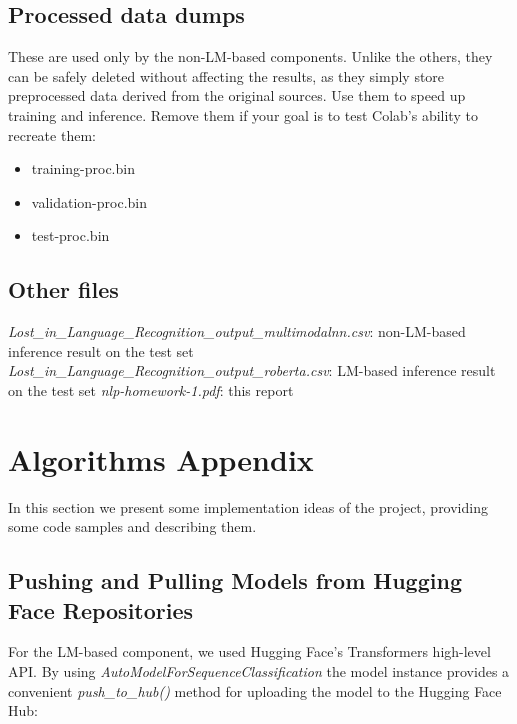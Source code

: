 \documentclass[11pt]{article}
\begin{document}
	 \subsection{Processed data dumps}
	 
	 These are used only by the non-LM-based components. Unlike the others, 
	 they can be safely deleted without affecting the results, 
	 as they simply store preprocessed data derived from the original sources. 
	 Use them to speed up training and inference. 
	 Remove them if your goal is to test Colab’s ability to recreate them:
	 
	 \begin{itemize}
	 	\item training-proc.bin
	 	\item validation-proc.bin
	 	\item test-proc.bin
	 \end{itemize}
	
	\subsection{Other files}
	
	\emph{Lost\_in\_Language\_Recognition\_output\_multimodalnn.csv}: non-LM-based inference result on the test set
	\emph{Lost\_in\_Language\_Recognition\_output\_roberta.csv}: LM-based inference result on the test set
	\emph{nlp-homework-1.pdf}: this report
	
	\section{Algorithms  Appendix}
	\label{sec:appendix}
	
	In this section we present some implementation ideas of the project, providing some
	code samples and describing them.
	
	\subsection{Pushing and Pulling Models from Hugging Face Repositories}
	
	For the LM-based component, we used Hugging Face’s Transformers high-level API. By using \emph{AutoModelForSequenceClassification}  the model instance provides a convenient 
	\emph{push\_to\_hub()} method for uploading the model to the Hugging Face Hub:
	
\end{document}
